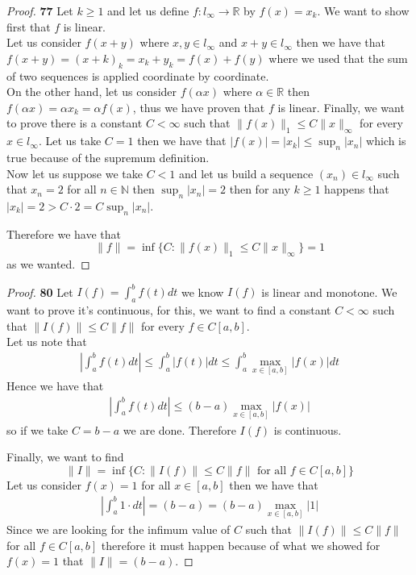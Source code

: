 \documentclass[11pt]{article}
\newcommand{\N}{\mathbb{N}}
\newcommand{\R}{\mathbb{R}}
\theoremstyle{definition}
\begin{document}
    \begin{proof}{\textbf{77}}
        Let $k \geq 1$ and let us define $f: l_\infty \to \R$ by $f(x) = x_k$.
        We want to show first that $f$ is linear.\\
        Let us consider $f(x + y)$ where $x,y\in l_\infty$ and
        $x + y \in l_\infty$
        then we have that
        $f(x + y) = (x + k)_k = x_k + y_k = f(x) + f(y)$
        where we used that the sum of two sequences is applied coordinate by
        coordinate.\\
        On the other hand, let us consider $f(\alpha x)$ where $\alpha \in \R$
        then $f(\alpha x) = \alpha x_k = \alpha f(x)$, thus we have 
        proven that $f$ is linear.
        Finally, we want to prove there is a constant $C < \infty$ such that
        $\|f(x)\|_1\leq C \|x\|_\infty$ for every $x \in l_\infty$.
        Let us take $C = 1$ then we have that
        $|f(x)| = |x_k| \leq \sup_{n} |x_n|$ 
        which is true because of the supremum definition.\\
        Now let us suppose we take $C < 1$ and let us build a sequence
        $(x_n) \in l_\infty$ such that $x_n = 2$ for all $n \in \N$ then
        $\sup_n |x_n| = 2$ then for any $k \geq 1 $  happens that
        $|x_k| = 2 > C \cdot 2 = C \sup_n |x_n|$.

        Therefore we have that
        $$\|f\| = \inf\{C : \|f(x)\|_1 \leq C \|x\|_\infty\} = 1$$
        as we wanted.
    \end{proof} 
    \cleardoublepage
    \begin{proof}{\textbf{80}}
        Let $I(f) = \int_a^b f(t) dt$ we know $I(f)$ is linear and monotone.
        We want to prove it's continuous, for this, we want to find a constant
        $C < \infty$ such that $\|I(f)\|\leq C \|f\|$ for every $f \in C[a,b]$.\\
        Let us note that
        \begin{align*}
            \left|\int_a^b f(t) dt\right| \leq \int_a^b |f(t)| dt
            \leq \int_a^b \max_{x \in [a,b]}|f(x)| dt
        \end{align*}
        Hence we have that
        \begin{align*}
            \left|\int_a^b f(t) dt\right|
            \leq (b - a)\max_{x \in [a,b]}|f(x)|
        \end{align*}
        so if we take $C = b - a$ we are done. Therefore $I(f)$ is continuous.

        Finally, we want to find
        $$\|I\| = \inf\{C: \|I(f)\| \leq C\|f\| \text{ for all } f \in C[a,b]\}$$
        Let us consider $f(x) = 1$ for all $x \in [a,b]$ then we have that
        \begin{align*}
            \left|\int_a^b 1 \cdot dt\right| = (b -a) = (b - a) \max_{x \in [a,b]} |1|
        \end{align*}
        Since we are looking for the infimum value of $C$ such that
        $\|I(f)\| \leq C\|f\|$ for all $f \in C[a, b]$
        therefore it must happen because of what we showed for $f(x) = 1$
        that $\|I\| = (b - a)$.
    \end{proof} 
\end{document}
